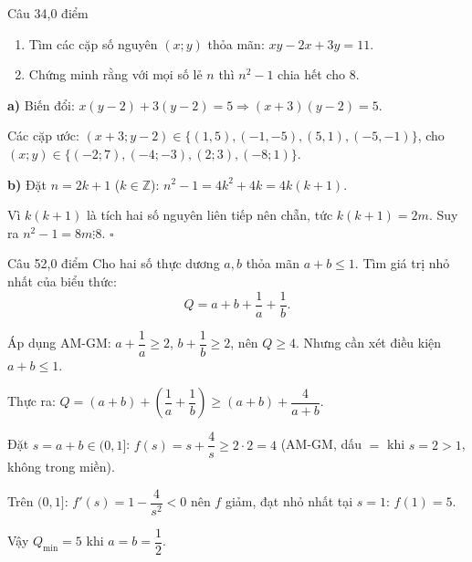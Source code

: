 \begin{de_cau}{Câu 3}{4,0 điểm}
\begin{enumerate}[label=\alph*)]
  \item Tìm các cặp số nguyên $(x;y)$ thỏa mãn: $xy - 2x + 3y = 11$.
  \item Chứng minh rằng với mọi số lẻ $n$ thì $n^2 - 1$ chia hết cho $8$.
\end{enumerate}
\end{de_cau}

\begin{loi_giai_cau}
\textbf{a)} Biến đổi: $x(y-2)+3(y-2)=5 \Rightarrow (x+3)(y-2)=5$.

Các cặp ước: $(x+3;y-2)\in\{(1,5),(-1,-5),(5,1),(-5,-1)\}$, cho $(x;y)\in\{(-2;7),(-4;-3),(2;3),(-8;1)\}$.

\textbf{b)} Đặt $n=2k+1$ ($k\in\mathbb{Z}$): $n^2-1=4k^2+4k=4k(k+1)$.

Vì $k(k+1)$ là tích hai số nguyên liên tiếp nên chẵn, tức $k(k+1)=2m$. Suy ra $n^2-1 = 8m \vdots 8$. $\square$
\end{loi_giai_cau}

\begin{de_cau}{Câu 5}{2,0 điểm}
Cho hai số thực dương $a, b$ thỏa mãn $a + b \le 1$. Tìm giá trị nhỏ nhất của biểu thức:
\[Q = a + b + \dfrac{1}{a} + \dfrac{1}{b}.\]
\end{de_cau}

\begin{loi_giai_cau}
Áp dụng AM-GM: $a + \dfrac{1}{a} \ge 2$, $b + \dfrac{1}{b} \ge 2$, nên $Q \ge 4$. Nhưng cần xét điều kiện $a+b\le1$.

Thực ra: $Q = (a+b) + \left(\dfrac{1}{a}+\dfrac{1}{b}\right) \ge (a+b) + \dfrac{4}{a+b}$.

Đặt $s=a+b\in(0,1]$: $f(s)=s+\dfrac{4}{s} \ge 2\cdot 2 = 4$ (AM-GM, dấu $=$ khi $s=2 > 1$, không trong miền).

Trên $(0,1]$: $f'(s)=1-\dfrac{4}{s^2}<0$ nên $f$ giảm, đạt nhỏ nhất tại $s=1$: $f(1)=5$.

Vậy $Q_{\min} = \boxed{5}$ khi $a=b=\dfrac{1}{2}$.
\end{loi_giai_cau}

